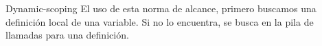\documentclass[12pt,oneside]{article}
\begin{document}
Dynamic-scoping
 El uso de esta norma de alcance, primero buscamos una definición local de una variable. Si no lo encuentra, se busca en la pila de llamadas para una definición.




\end{document}
